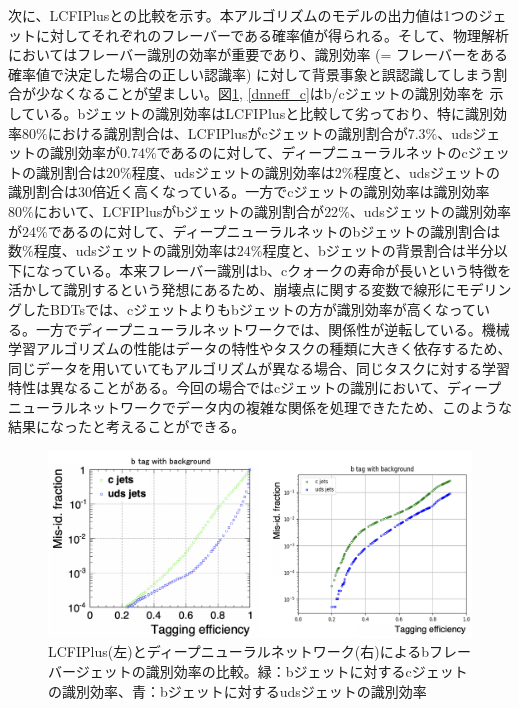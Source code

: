 次に、LCFIPlusとの比較を示す。本アルゴリズムのモデルの出力値は1つのジェットに対してそれぞれのフレーバーである確率値が得られる。そして、物理解析においてはフレーバー識別の効率が重要であり、識別効率 (= フレーバーをある確率値で決定した場合の正しい認識率) に対して背景事象と誤認識してしまう割合が少なくなることが望ましい。図\ref{dnneff_b}, \ref{dnneff_c}はb/cジェットの識別効率を
示している。bジェットの識別効率はLCFIPlusと比較して劣っており、特に識別効率$80\%$における識別割合は、LCFIPlusがcジェットの識別割合が$7.3\%$、udsジェットの識別効率が$0.74\%$であるのに対して、ディープニューラルネットのcジェットの識別割合は$20\%程度$、udsジェットの識別効率は$2\%程度$と、udsジェットの識別割合は30倍近く高くなっている。一方でcジェットの識別効率は識別効率$80\%$において、LCFIPlusがbジェットの識別割合が$22\%$、udsジェットの識別効率が$24\%$であるのに対して、ディープニューラルネットのbジェットの識別割合は$数\%程度$、udsジェットの識別効率は$24\%程度$と、bジェットの背景割合は半分以下になっている。本来フレーバー識別はb、cクォークの寿命が長いという特徴を活かして識別するという発想にあるため、崩壊点に関する変数で線形にモデリングしたBDTsでは、cジェットよりもbジェットの方が識別効率が高くなっている。一方でディープニューラルネットワークでは、関係性が逆転している。機械学習アルゴリズムの性能はデータの特性やタスクの種類に大きく依存するため、同じデータを用いていてもアルゴリズムが異なる場合、同じタスクに対する学習特性は異なることがある。今回の場合ではcジェットの識別において、ディープニューラルネットワークでデータ内の複雑な関係を処理できたため、このような結果になったと考えることができる。
\begin{figure}[H]
	\begin{center}
 \includegraphics[keepaspectratio, scale=0.3]
 	{Figure/Flavortagging/dnneff_b.png}
 		\caption{LCFIPlus(左)とディープニューラルネットワーク(右)によるbフレーバージェットの識別効率の比較。緑：bジェットに対するcジェットの識別効率、青：bジェットに対するudsジェットの識別効率}
 		\label{dnneff_b}
	\end{center}
\end{figure}


